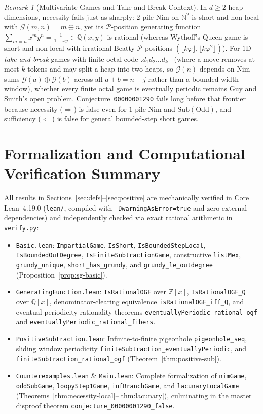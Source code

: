\documentclass[11pt]{article}
\theoremstyle{definition}
\theoremstyle{remark}
\newtheorem{remark}[theorem]{Remark}
\newcommand{\N}{\mathbb{N}}
\newcommand{\Z}{\mathbb{Z}}
\newcommand{\Q}{\mathbb{Q}}
\newcommand{\G}{\mathcal{G}}
\newcommand{\Ppos}{\mathcal{P}}
\newcommand{\Sub}{\mathrm{Sub}}
\begin{document}
\begin{remark}[Multivariate Games and Take-and-Break Context]
\label{rem:2d}
In $d \ge 2$ heap dimensions, necessity fails just as sharply: $2$-pile Nim on $\N^2$ is short and non-local with $\G(m,n) = m \oplus n$, yet its $\Ppos$-position generating function $\sum_{m=n} x^m y^n = \frac{1}{1-xy} \in \Q(x,y)$ is rational (whereas Wythoff's Queen game is short and non-local with irrational Beatty $\Ppos$-positions $(\lfloor k\varphi \rfloor, \lfloor k\varphi^2 \rfloor)$). For $1$D \emph{take-and-break} games with finite octal code $.d_1 d_2 \dots d_k$~\cite{GuySmith} (where a move removes at most $k$ tokens and may split a heap into two heaps, so $\G(n)$ depends on Nim-sums $\G(a) \oplus \G(b)$ across all $a+b = n-j$ rather than a bounded-width window), whether every finite octal game is eventually periodic remains Guy and Smith's open problem. Conjecture~\texttt{00000001290} fails long before that frontier because necessity ($\Rightarrow$) is false even for $1$-pile Nim and $\Sub(\mathrm{Odd})$, and sufficiency ($\Leftarrow$) is false for general bounded-step short games.
\end{remark}

\section{Formalization and Computational Verification Summary}

All results in Sections~\ref{sec:defs}--\ref{sec:positive} are mechanically verified in Core Lean~4.19.0 (\texttt{lean/}, compiled with \texttt{-DwarningAsError=true} and zero external dependencies) and independently checked via exact rational arithmetic in \texttt{verify.py}:
\begin{itemize}
\raggedright
  \item \texttt{Basic.lean}: \texttt{ImpartialGame}, \texttt{IsShort}, \texttt{IsBoundedStepLocal}, \texttt{IsBoundedOutDegree}, \texttt{IsFiniteSubtractionGame}, constructive \texttt{listMex}, \texttt{grundy\_unique}, \texttt{short\_has\_grundy}, and \texttt{grundy\_le\_outdegree} (Proposition~\ref{prop:sg-basic}).
  \item \texttt{GeneratingFunction.lean}: \texttt{IsRationalOGF} over $\Z[x]$, \texttt{IsRationalOGF\_Q} over $\Q[x]$, denominator-clearing equivalence \texttt{isRationalOGF\_iff\_Q}, and eventual-periodicity rationality theorems \texttt{eventuallyPeriodic\_rational\_ogf} and \texttt{eventuallyPeriodic\_rational\_fibers}.
  \item \texttt{PositiveSubtraction.lean}: Infinite-to-finite pigeonhole \texttt{pigeonhole\_seq}, sliding window periodicity \texttt{finiteSubtraction\_eventuallyPeriodic}, and \texttt{finiteSubtraction\_rational\_ogf} (Theorem~\ref{thm:positive-sub}).
  \item \texttt{Counterexamples.lean} \& \texttt{Main.lean}: Complete formalization of \texttt{nimGame}, \texttt{oddSubGame}, \texttt{loopyStep1Game}, \texttt{infBranchGame}, and \texttt{lacunaryLocalGame} (Theorems~\ref{thm:necessity-local}--\ref{thm:lacunary}), culminating in the master disproof theorem \texttt{conjecture\_00000001290\_false}.
\end{itemize}
\end{document}
